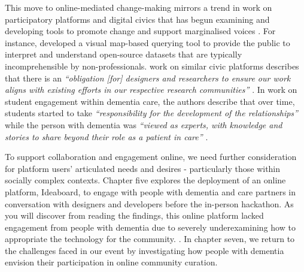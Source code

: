 This move to online-mediated change-making mirrors a trend in work on participatory platforms and digital civics that has begun examining and developing tools to promote change and support marginalised voices \citep{corbett_exploring_2018}. For instance, \cite{puussaar_making_2018} developed a visual map-based querying tool to provide the public to interpret and understand open-source datasets that are typically incomprehensible by non-professionals. \cite{asad_tap_2017} work on similar civic platforms describes that there is an \textit{``obligation [for] designers and researchers to ensure our work aligns with existing efforts in our respective research communities'' \citep[pg. 6314]{asad_tap_2017}}. In \cite{foley_student_2020} work on student engagement within dementia care, the authors describe that over time, students started to take \textit{``responsibility for the development of the relationships''} while the person with dementia was \textit{``viewed as experts, with knowledge and stories to share beyond their role as a patient in care'' \citep[pg. 9]{foley_student_2020}}. 

To support collaboration and engagement online, we need further consideration for platform users’ articulated needs and desires - particularly those within socially complex contexts. Chapter five explores the deployment of an online platform, Ideaboard, to engage with people with dementia and care partners in conversation with designers and developers before the in-person hackathon. As you will discover from reading the findings, this online platform lacked engagement from people with dementia due to severely underexamining how to appropriate the technology for the community. \citep{lindqvist2018contrasting}. In chapter seven, we return to the challenges faced in our event by investigating how people with dementia envision their participation in online community curation.

